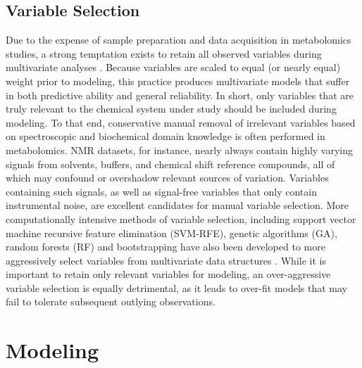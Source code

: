 \subsection{Variable Selection}

\begin{doublespace}
Due to the expense of sample preparation and data acquisition in metabolomics
studies, a strong temptation exists to retain all observed variables during
multivariate analyses \cite{kjeldahl:jchemo2010}. Because variables are scaled
to equal (or nearly equal) weight prior to modeling, this practice produces
multivariate models that suffer in both predictive ability and general
reliability. In short, only variables that are truly relevant to the chemical
system under study should be included during modeling. To that end,
conservative manual removal of irrelevant variables based on spectroscopic
and biochemical domain knowledge is often performed in metabolomics. \hnmr{}
NMR datasets, for instance, nearly always contain highly varying signals from
solvents, buffers, and chemical shift reference compounds, all of which may
confound or overshadow relevant sources of variation. Variables containing
such signals, as well as signal-free variables that only contain instrumental
noise, are excellent candidates for manual variable selection. More
computationally intensive methods of variable selection, including support
vector machine recursive feature elimination (SVM-RFE), genetic algorithms
(GA), random forests (RF) and bootstrapping have also been developed to more
aggressively select variables from multivariate data structures
\cite{lin:metab2011,wongravee:anchem2009}. While it is important to retain
only relevant variables for modeling, an over-aggressive variable selection
is equally detrimental, as it leads to over-fit models that may fail to
tolerate subsequent outlying observations.
\end{doublespace}

\section{Modeling}

